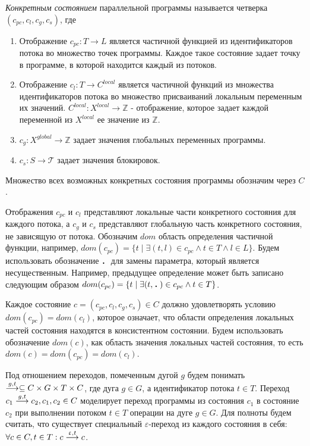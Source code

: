 \emph{Конкретным состоянием} параллельной программы называется четверка $(c_{pc}, c_l, c_g, c_s)$, где
\begin{enumerate}
\item Отображение $c_{pc}: T \to L$ является частичной функцией из идентификаторов потока во множество точек программы.
Каждое такое состояние задает точку в программе, в которой находится каждый из потоков.
\item Отображение $c_l: T \to C^{local}$ является частичной функций из множества идентификаторов потока во множество присваиваний локальным переменным их значений. $C^{local}: X^{local} \to \mathbb{Z}$ - отображение, которое задает каждой переменной из $X^{local}$ ее значение из $\mathbb{Z}$.
\item $c_g: X^{global} \to \mathbb{Z}$ задает значения глобальных переменных программы.
\item $c_s: S \to \mathcal{T}$ задает значения блокировок. 
\end{enumerate}
Множество всех возможных конкретных состояния программы обозначим через $C$.

Отображения $c_{pc}$ и $c_l$ представляют локальные части конкретного состояния для каждого потока, а $c_g$ и $c_s$ представляют глобальную часть конкретного состояния, не зависящую от потока.
Обозначим $dom$ область определения частичной функции, например, $dom(c_{pc})=\{ t \mid \exists (t, l) \in c_{pc} \land t \in T \land l \in L \}$.
Будем использовать обозначение $\qdot$ для замены параметра, который является несущественным.
Например, предыдущее определение может быть записано следующим образом $dom(c_{pc})=\{ t \mid \exists (t, \qdot) \in c_{pc} \land t \in T\}$.

Каждое состояние $c=(c_{pc}, c_l, c_g, c_s)\in C$ должно удовлетворять условию $dom(c_{pc})=dom(c_l)$, которое означает, что области определения локальных частей состояния находятся в консистентном состоянии.
Будем использовать обозначение $dom(c)$, как область значения локальных частей состояния, то есть $dom(c)=dom(c_{pc})=dom(c_l)$.

Под отношением переходов, помеченным дугой $g$ будем понимать $\stackrel{g,t}{\longrightarrow} \subseteq C \times G \times T \times C$, где дуга $g \in G$, а идентификатор потока $t \in T$.
Переход  $c_1 \stackrel{g,t}{\longrightarrow} c_2, c_1, c_2 \in C$ моделирует переход программы из состояния $c_1$ в состояние $c_2$ при выполнении потоком $t \in T$ операции на дуге $g \in G$.
Для полноты будем считать, что существует специальный $\varepsilon$-переход из каждого состояния в себя:
$\forall c \in C, t \in T: c \stackrel{\upvarepsilon, t}{\longrightarrow} c$.

